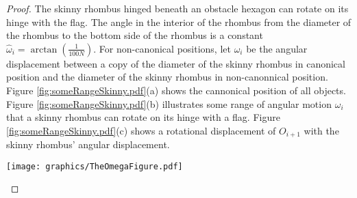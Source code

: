 \documentclass[10pt]{CSUNthesis}
\theoremstyle{plain}%
\theoremstyle{definition}
\theoremstyle{remark}
\newcommand{\lr}[1]{\left( #1 \right)}
\begin{document}
\begin{proof}
The skinny rhombus hinged beneath an obstacle hexagon can rotate on its hinge with the flag. 
The angle in the interior of the rhombus from the diameter of the rhombus to the bottom side of the rhombus is a constant $\hat{\omega}_i = \arctan \lr{\frac{1}{100N}}$.  
For non-canonical positions, let $\omega_i$ be the angular displacement between a copy of the diameter of the skinny rhombus in canonical position and the diameter of the skinny rhombus in non-canonnical position.  
Figure \ref{fig:someRangeSkinny.pdf}(a) shows the cannonical position of all objects.  
Figure \ref{fig:someRangeSkinny.pdf}(b) illustrates some range of angular motion $\omega_i$ that a skinny rhombus can rotate on its hinge with a flag.  
Figure \ref{fig:someRangeSkinny.pdf}(c) shows a rotational displacement of $O_{i+1}$ with the skinny rhombus' angular displacement.

\begin{minipage}{\linewidth}
\begin{center}
\texttt{[image: graphics/TheOmegaFigure.pdf]}
\label{fig:TheOmegaFigure.pdf}
\end{center}
\end{minipage}


\end{proof}
\end{document}
